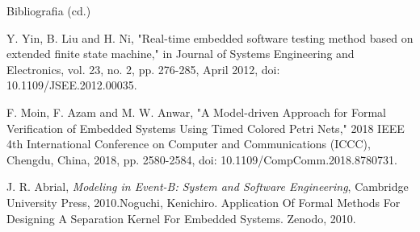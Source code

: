 \documentclass{beamer}
\begin{document}
\begin{frame}{Bibliografia (cd.)}
  \scriptsize
  \begin{thebibliography}{9}
    Y. Yin, B. Liu and H. Ni, "Real-time embedded software testing method based on extended finite state machine," in Journal of Systems Engineering and Electronics, vol. 23, no. 2, pp. 276-285, April 2012, doi: 10.1109/JSEE.2012.00035.
    
    F. Moin, F. Azam and M. W. Anwar, "A Model-driven Approach for Formal Verification of Embedded Systems Using Timed Colored Petri Nets," 2018 IEEE 4th International Conference on Computer and Communications (ICCC), Chengdu, China, 2018, pp. 2580-2584, doi: 10.1109/CompComm.2018.8780731.

    J. R. Abrial, \emph{Modeling in Event-B: System and Software Engineering}, Cambridge University Press, 2010.Noguchi, Kenichiro. Application Of Formal Methods For Designing A Separation Kernel For Embedded Systems. Zenodo, 2010.

  \end{thebibliography}
\end{frame}
\end{document}
